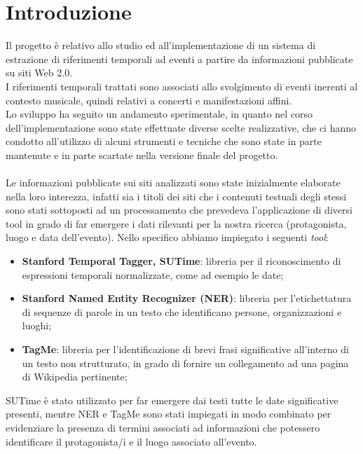 \documentclass[a4paper]{report}
\begin{document}
\chapter{Introduzione}
Il progetto è relativo allo studio ed all'implementazione di un sistema di estrazione di riferimenti temporali ad eventi a partire da informazioni pubblicate su siti Web 2.0. \\
I riferimenti temporali trattati sono associati allo svolgimento di eventi inerenti al contesto musicale, quindi relativi a concerti e manifestazioni affini. \\
Lo sviluppo ha seguito un andamento sperimentale, in quanto nel corso dell'implementazione sono state effettuate diverse scelte realizzative, che ci hanno condotto all'utilizzo di alcuni strumenti e tecniche che sono state in parte mantenute e in parte scartate nella versione finale del progetto. \\ 
\\
Le informazioni pubblicate sui siti analizzati sono state inizialmente elaborate nella loro interezza, infatti sia i titoli dei siti che i contenuti testuali degli stessi sono stati sottoposti ad un processamento che prevedeva l'applicazione di diversi tool in grado di far emergere i dati rilevanti per la nostra ricerca (protagonista, luogo e data dell'evento). Nello specifico abbiamo impiegato i seguenti \textit{tool}:
\begin{itemize}
\item \textbf{Stanford Temporal Tagger, SUTime}\cite{1}: libreria per il riconoscimento di espressioni temporali normalizzate, come ad esempio le date;
\item \textbf{Stanford Named Entity Recognizer (NER)}\cite{2}:  libreria per l'etichettatura di sequenze di parole in un testo che identificano persone, organizzazioni e luoghi;
\item \textbf{TagMe}\cite{3}: libreria per l'identificazione di brevi frasi significative all'interno di un testo non strutturato, in grado di fornire un collegamento ad una pagina di Wikipedia pertinente;
\end{itemize}
SUTime è stato utilizzato per far emergere dai testi tutte le date significative presenti, mentre NER e TagMe sono stati impiegati in modo combinato per evidenziare la presenza di termini associati ad informazioni che potessero identificare il protagonista/i e il luogo associato all'evento.
\end{document}
